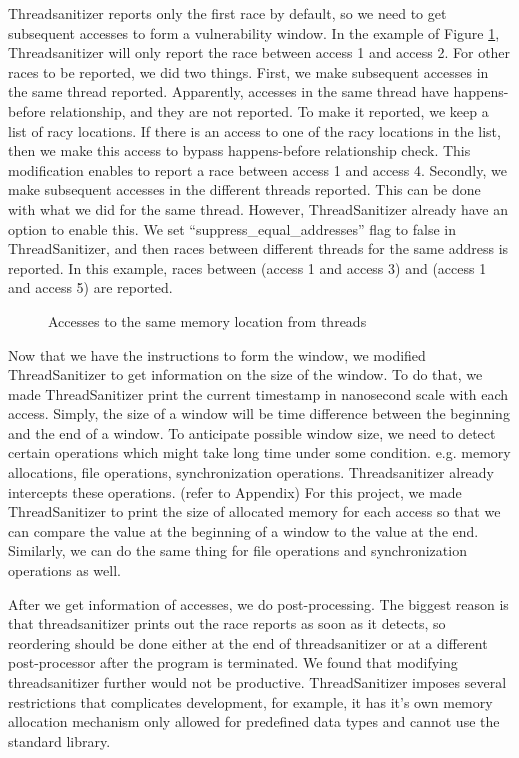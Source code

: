 \documentclass{acm_proc_article-sp}
\begin{document}
Threadsanitizer reports only the first race by default, so we need to get subsequent accesses to form a vulnerability window. In the example of Figure \ref{fig:threadAccesses}, Threadsanitizer will only report the race between access 1 and access 2. For other races to be reported, we did two things. First, we make subsequent accesses in the same thread reported. Apparently, accesses in the same thread have happens-before relationship, and they are not reported. To make it reported, we keep a list of racy locations. If there is an access to one of the racy locations in the list, then we make this access to bypass happens-before relationship check. This modification enables to report a race between access 1 and access 4. Secondly, we make subsequent accesses in the different threads reported. This can be done with what we did for the same thread. However, ThreadSanitizer already have an option to enable this. We set  “suppress\_equal\_addresses” flag to false in ThreadSanitizer, and then races between different threads for the same address is reported. In this example, races between (access 1 and access 3) and (access 1 and access 5) are reported.

\begin{figure}
\centering
{}
\caption{Accesses to the same memory location from threads}
\label{fig:threadAccesses}
\end{figure}


Now that we have the instructions to form the window, we modified ThreadSanitizer to get information on the size of the window. To do that, we made ThreadSanitizer print the current timestamp in nanosecond scale with each access. Simply, the size of a window will be time difference between the beginning and the end of a window. To anticipate possible window size, we need to detect certain operations which might take long time under some condition. e.g. memory allocations, file operations, synchronization operations. Threadsanitizer already intercepts these operations. (refer to Appendix) For this project, we made ThreadSanitizer to print the size of allocated memory for each access so that we can compare the value at the beginning of a window to the value at the end. Similarly, we can do the same thing for file operations and synchronization operations as well.

After we get information of accesses, we do post-processing. The biggest reason is that threadsanitizer prints out the race reports as soon as it detects, so reordering should be done either at the end of threadsanitizer or at a different post-processor after the program is terminated. We found that modifying threadsanitizer further would not be productive. ThreadSanitizer imposes several restrictions that complicates development, for example, it has it's own memory allocation mechanism only allowed for predefined data types and cannot use the standard library. 
\end{document}
